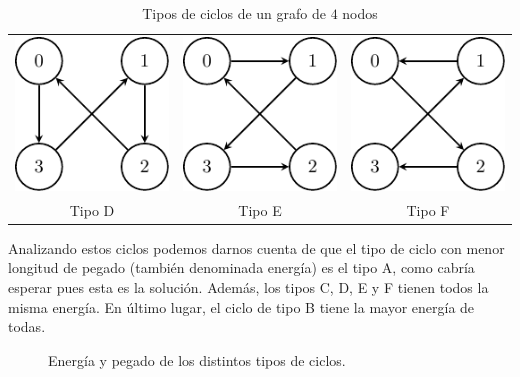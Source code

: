 \documentclass[11pt]{article}
\begin{document}
\begin{table}[H]
\begin{tabular}{ccc}
		\includegraphics[scale=.9]{figures/salesman-cycleD.pdf} &
		\includegraphics[scale=.9]{figures/salesman-cycleE.pdf} &
		\includegraphics[scale=.9]{figures/salesman-cycleF.pdf} \\
		
		Tipo D & Tipo E & Tipo F \\
	\end{tabular}
	\caption{Tipos de ciclos de un grafo de $4$ nodos}
	\label{tbl:salesman-cycles}
\end{table}

Analizando estos ciclos podemos darnos cuenta de que el tipo de ciclo con menor longitud de pegado (también denominada energía) es el tipo A, como cabría esperar pues esta es la solución. Además, los tipos C, D, E y F tienen todos la misma energía. En último lugar, el ciclo de tipo B tiene la mayor energía de todas.

\begin{figure}[H]
	\centering
	\caption{Energía y pegado de los distintos tipos de ciclos.}
\end{figure}
\end{document}
